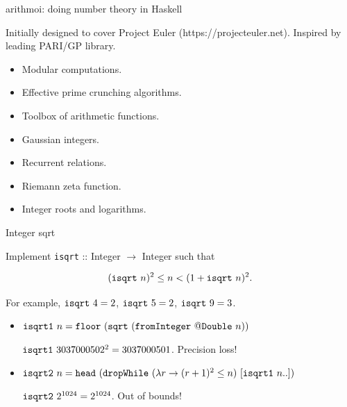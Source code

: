 \documentclass[handout]{beamer}
\def\isqrt#1{{\tt isqrt}~#1}
\def\isqrta#1{{\tt isqrt1}~#1}
\def\isqrtb#1{{\tt isqrt2}~#1}
\begin{document}
\begin{frame}{arithmoi: doing number theory in Haskell}

Initially designed to cover Project Euler (https://projecteuler.net).
Inspired by leading PARI/GP library.

\begin{itemize}
\item Modular computations.
\item Effective prime crunching algorithms.
\item Toolbox of arithmetic functions.
\item Gaussian integers.
\item Recurrent relations.
\item Riemann zeta function.
\item Integer roots and logarithms.
\end{itemize}

\end{frame}

\begin{frame}{Integer sqrt}
\begin{adjustwidth}{-1.5em}{-1.5em}

Implement {\tt isqrt} :: Integer $\to$ Integer such that

$$(\isqrt n)^2 \le n < (1 + \isqrt n)^2.$$

For example, $\isqrt 4 = 2$, $\isqrt 5 = 2$, $\isqrt 9 = 3$.

\bigskip

\begin{itemize}

\item $\isqrta n = {\tt floor}~({\tt sqrt}~({\tt fromInteger}~@{\tt Double}~n))$

\bigskip

  $\isqrta 3037000502^2 = 3037000501$. Precision loss!

\bigskip

\item $\isqrtb n = {\tt head}~({\tt dropWhile}~(\lambda r \to (r+1)^2 \le n)~[\isqrta n..])$

\bigskip

  $\isqrtb 2^{1024} = 2^{1024}$. Out of bounds!

\end{itemize}

\end{adjustwidth}
\end{frame}
\end{document}
